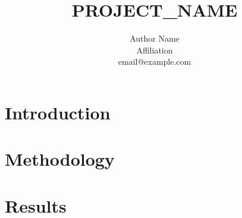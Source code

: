 \documentclass{article}
\title{PROJECT_NAME}
\author{
  Author Name\\
  Affiliation\\
  email@example.com
}
\begin{document}
\maketitle

\begin{abstract}
\end{abstract}

\section{Introduction}
\section{Methodology}
\section{Results}



\end{document}
